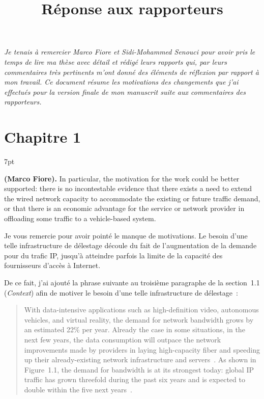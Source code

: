 \documentclass[11pt]{article}
\title{Réponse aux rapporteurs}
\makeatletter
\renewcommand{\maketitle}{%
  \begingroup
  \setlength{\parindent}{0pt}
  \setlength{\parskip}{6pt}
  \linespread{1.1}
    {\begingroup
      \sffamily
	  \par{\Huge\uppercase{\@title}}
      \par{\@author}
      \par
    \endgroup}
  \endgroup
}
\newenvironment{formal}{%
  \vspace*{-5pt}
  \def\FrameCommand{%
    \hspace{-5pt}%
    {\color{gray50}\vrule width 1.25pt}%
    \colorbox{formalcolor}%
  }%
  \MakeFramed{\advance\hsize-\width\FrameRestore}%
  \noindent\hspace{-4.55pt}%
  \begin{adjustwidth}{}{7pt}%
  \normalsize
  \vspace{-2pt}
}
{%
  \vspace{2pt}\end{adjustwidth}\endMakeFramed%
  \vspace*{-10pt}
}
\makeatother
\begin{document}
 
\maketitle

\def\baselinestretch{1.1}
\normalsize

\vspace{10pt}

\textit{Je tenais à remercier Marco Fiore et Sidi-Mohammed Senouci pour avoir pris le temps de lire ma thèse avec détail et rédigé leurs rapports qui, par leurs commentaires très pertinents m'ont donné des éléments de réflexion par rapport à mon travail. Ce document résume les motivations des changements que j'ai effectués pour la version finale de mon manuscrit suite aux commentaires des rapporteurs.}

\section{Chapitre 1}

\begin{formal}
    \textbf{(Marco Fiore).} In particular, the motivation for the work could be better supported: there is no incontestable evidence that there exists a need to extend the wired network capacity to accommodate the existing or future traffic demand, or that there is an economic advantage for the service or network provider in offloading some traffic to a vehicle-based system.
\end{formal}

Je vous remercie pour avoir pointé le manque de motivations. Le besoin d'une telle infrastructure de délestage découle du fait de l'augmentation de la demande pour du trafic IP, jusqu'à atteindre parfois la limite de la capacité des fournisseurs d'accès à Internet.

De ce fait, j'ai ajouté la phrase suivante au troisième paragraphe de la section~1.1 (\textit{Context}) afin de motiver le besoin d'une telle infrastructure de délestage~:
\begin{quote}
With data-intensive applications such as high-definition video, autonomous vehicles, and virtual reality, the demand for network bandwidth grows by an estimated 22\% per year. Already the case in some situations, in the next few years, the data consumption will outpace the network improvements made by providers in laying high-capacity fiber and speeding up their already-existing network infrastructure and servers~\cite{hecht2016bandwidth}. As shown in Figure~1.1, the demand for bandwidth is at its strongest today: global IP traffic has grown threefold during the past six years and is expected to double within the five next years~\cite{index2014forecast,gantz2012digital}.
\end{quote}
\end{document}
